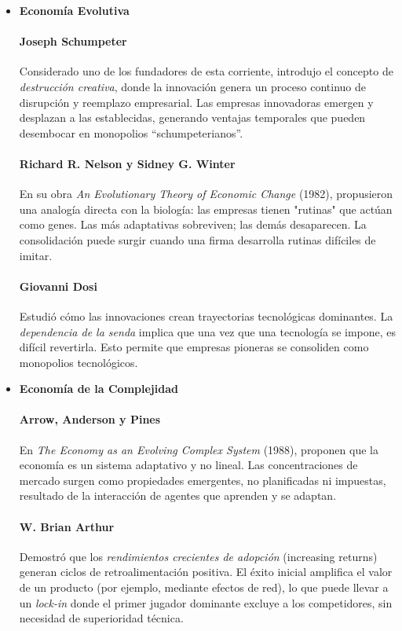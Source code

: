 \documentclass[a4paper,12pt]{article}
\begin{document}
\begin{itemize}
    \item \textbf{Economía Evolutiva}

    \paragraph{Joseph Schumpeter} Considerado uno de los fundadores de esta corriente, introdujo el concepto de \textit{destrucción creativa}, donde la innovación genera un proceso continuo de disrupción y reemplazo empresarial. Las empresas innovadoras emergen y desplazan a las establecidas, generando ventajas temporales que pueden desembocar en monopolios “schumpeterianos”.

    \paragraph{Richard R. Nelson y Sidney G. Winter} En su obra \textit{An Evolutionary Theory of Economic Change} (1982), propusieron una analogía directa con la biología: las empresas tienen "rutinas" que actúan como genes. Las más adaptativas sobreviven; las demás desaparecen. La consolidación puede surgir cuando una firma desarrolla rutinas difíciles de imitar.

    \paragraph{Giovanni Dosi} Estudió cómo las innovaciones crean trayectorias tecnológicas dominantes. La \textit{dependencia de la senda} implica que una vez que una tecnología se impone, es difícil revertirla. Esto permite que empresas pioneras se consoliden como monopolios tecnológicos.

    \item \textbf{Economía de la Complejidad}

    \paragraph{Arrow, Anderson y Pines} En \textit{The Economy as an Evolving Complex System} (1988), proponen que la economía es un sistema adaptativo y no lineal. Las concentraciones de mercado surgen como propiedades emergentes, no planificadas ni impuestas, resultado de la interacción de agentes que aprenden y se adaptan.

    \paragraph{W. Brian Arthur} Demostró que los \textit{rendimientos crecientes de adopción} (increasing returns) generan ciclos de retroalimentación positiva. El éxito inicial amplifica el valor de un producto (por ejemplo, mediante efectos de red), lo que puede llevar a un \textit{lock-in} donde el primer jugador dominante excluye a los competidores, sin necesidad de superioridad técnica.


\end{itemize}
\end{document}
